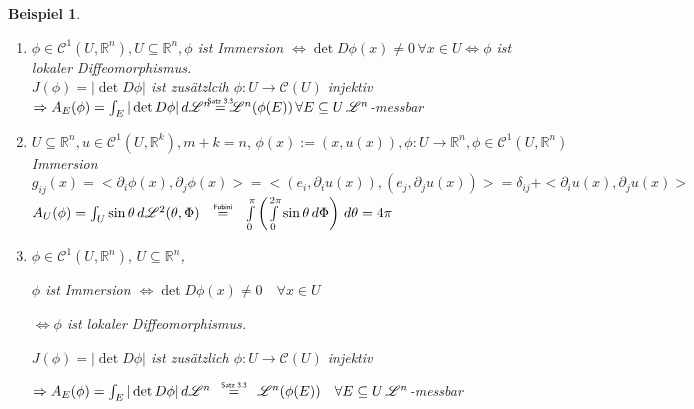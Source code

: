 \documentclass[11pt]{memoir}
\theoremstyle{changebreak}
\newtheorem{Beispiel}{Beispiel}[chapter]
\newcommand\overequal[1]{\mathrel{\overset{\makebox[0pt]{\mbox{\normalfont\tiny\sffamily $ #1 $}}}{=}}}
\begin{document}
\begin{Beispiel}
\begin{enumerate}

	$A_U(\phi) = \int_U \sin\theta\,d\mathscr L^2(\theta, \Phi) \overequal{\text{Fubini}} \int\limits_0^\pi \left( \int\limits_0^{2\pi} \sin\theta \, d\Phi\right) \,d\theta = 4 \pi$

	\item $\phi \in \mathscr C^1(U, \mathbb R^n), U \subseteq \mathbb R^n, \phi$ ist Immersion $\Leftrightarrow \det D\phi(x) \ne 0 \, \forall x \in U \Leftrightarrow \phi$ ist lokaler Diffeomorphismus. \\
	$J(\phi)= |\det D\phi|$ ist zusätzlcih $\phi: U \rightarrow \mathscr C(U)$ injektiv \\
	$\Rightarrow A_E (\phi) = \int_E |\det D\phi|\, d\mathscr L^n \overequal{\text{Satz 3.3}} \mathscr L^n(\phi(E)) \, \forall E \subseteq U \, \mathscr L^n$-messbar

	\item $U \subseteq \mathbb R^n, u \in \mathscr C^1(U, \mathbb R^k), m+k =n,\, \phi(x) := (x, u(x)), \phi: U \rightarrow \mathbb R^n, \phi \in \mathscr C^1(U, \mathbb R^n)$ Immersion \\
	$g_{ij}(x) = <\partial_i \phi(x), \partial_j \phi(x)> = <(e_i, \partial_i u(x)), (e_j, \partial_j u(x))> =
	\delta_{ij} + <\partial_i u(x), \partial_j u(x)> $ \\


	$A_U(\phi) = \int_U \sin\theta\,d\mathscr L^2(\theta, \Phi) \quad \overequal{\text{Fubini}} \quad \int\limits_0^\pi \left( \int\limits_0^{2\pi} \sin\theta \, d\Phi\right) \,d\theta = 4 \pi$

	\item $\phi \in \mathscr C^1(U, \mathbb R^n), \, U \subseteq \mathbb R^n$,
	\par
	$\phi$ ist Immersion $\Leftrightarrow \det D\phi(x) \ne 0 \quad \forall x \in U$
	\par
	$\Leftrightarrow \phi$ ist lokaler Diffeomorphismus.
	\par
	$J(\phi)= |\det D\phi|$ ist zusätzlich $\phi: U \rightarrow \mathscr C(U)$ injektiv
	\par
	$\Rightarrow A_E (\phi) = \int_E |\det D\phi|\, d\mathscr L^n \quad \overequal{\text{Satz 3.3}} \quad \mathscr L^n(\phi(E)) \quad \forall E \subseteq U \, \mathscr L^n$-messbar


\end{enumerate}
\end{Beispiel}
\end{document}
